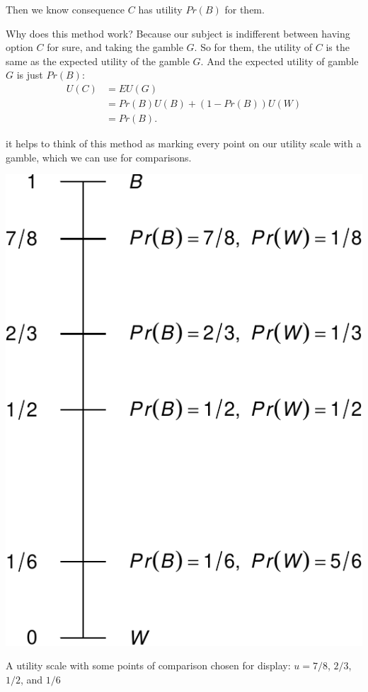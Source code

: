 \documentclass[justified]{tufte-book}
\renewcommand{\u}{U}
\newcommand{\p}{Pr}
\newcommand{\EU}{EU}
\theoremstyle{definition}
\theoremstyle{definition}
\theoremstyle{definition}
\theoremstyle{definition}
\theoremstyle{remark}
\begin{document}
Then we know consequence \(C\) has utility \(\p(B)\) for them.

Why does this method work? Because our subject is indifferent between having option \(C\) for sure, and taking the gamble \(G\). So for them, the utility of \(C\) is the same as the expected utility of the gamble \(G\). And the expected utility of gamble \(G\) is just \(\p(B)\):
\[
  \begin{aligned}
    \u(C) &= \EU(G)\\
          &= \p(B) \u(B) + (1-\p(B)) \u(W)\\
          &= \p(B).
  \end{aligned}
\]

 it helps to think of this method as marking every point on our utility scale with a gamble, which we can use for comparisons.

\begin{marginfigure}
\includegraphics{_main_files/figure-latex/uscale-1} \caption[A utility scale with some points of comparison chosen for display]{A utility scale with some points of comparison chosen for display: $u = 7/8$, $2/3$, $1/2$, and $1/6$}\label{fig:uscale}
\end{marginfigure}
\end{document}
